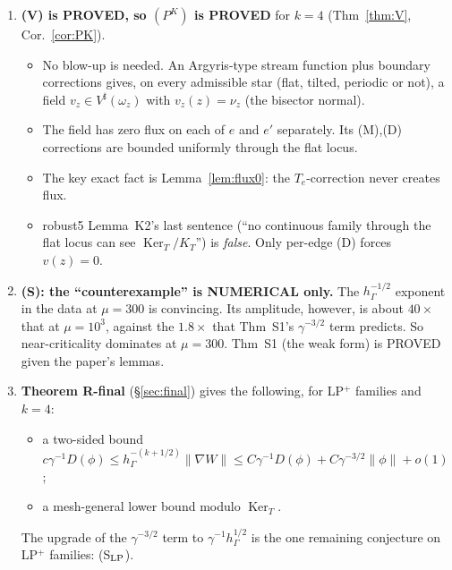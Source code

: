 \documentclass[11pt]{article}
\theoremstyle{remark}
\newcommand{\hG}{h_\Gamma}
\begin{document}
\begin{enumerate}
\begin{itemize}
\begin{itemize}
 $\gamma_C=(\tfrac15,\tfrac25)$ is still shape independent (robust5 had $(-\tfrac1{20},-\tfrac1{10})$).
 \item Re-certified: $\kappa_T(30^\circ)\ge2.1\times10^{-6}$ and $\kappa_T(20^\circ)\ge5.6\times10^{-7}$. Negative controls at $2.17\times10^{-6}$
 and $5.7\times10^{-7}$ are refuted.
 \item So robust4 Thm~4.1 (lower bound modulo $\operatorname{Ker}_T$) is PROVED for $k=4$, with these constants.
 \end{itemize}
 \end{itemize}
\item \textbf{(V) is PROVED, so $(P^K)$ is PROVED} for $k=4$ (Thm~\ref{thm:V}, Cor.~\ref{cor:PK}).
 \begin{itemize}
 \item No blow-up is needed. An Argyris-type stream function plus boundary corrections gives, on every admissible star (flat,
 tilted, periodic or not), a field $v_z\in V^\sharp(\omega_z)$ with $v_z(z)=\nu_z$ (the bisector normal).
 \item The field has zero flux on each of $e$ and $e'$ separately. Its (M),(D) corrections are bounded uniformly through the flat locus.
 \item The key exact fact is Lemma~\ref{lem:flux0}: the $T_e$-correction never creates flux.
 \item robust5 Lemma~K2's last sentence (``no continuous family through the flat locus can see $\operatorname{Ker}_T/K_T$'') is
 \emph{false}. Only per-edge (D) forces $v(z)=0$.
 \end{itemize}
\item \textbf{(S): the ``counterexample'' is NUMERICAL only.} The $\hG^{-1/2}$ exponent in the data at $\mu=300$ is convincing.
 Its amplitude, however, is about $40\times$ that at $\mu=10^3$, against the $1.8\times$ that Thm~S1's $\gamma^{-3/2}$ term predicts. So near-criticality dominates
 at $\mu=300$. Thm~S1 (the weak form) is PROVED given the paper's lemmas.
\item \textbf{Theorem R-final} (\S\ref{sec:final}) gives the following, for LP$^+$ families and $k=4$:
 \begin{itemize}
 \item a two-sided bound $c\gamma^{-1}D(\phi)\le\hG^{-(k+1/2)}\|\nabla W\|\le C\gamma^{-1}D(\phi)+C\gamma^{-3/2}\|\phi\|+o(1)$;
 \item a mesh-general lower bound modulo $\operatorname{Ker}_T$.
 \end{itemize}
 The upgrade of the $\gamma^{-3/2}$ term to $\gamma^{-1}\hG^{1/2}$ is the one remaining conjecture on LP$^+$ families: (S$_{\rm LP}$).
\end{enumerate}
\end{document}

